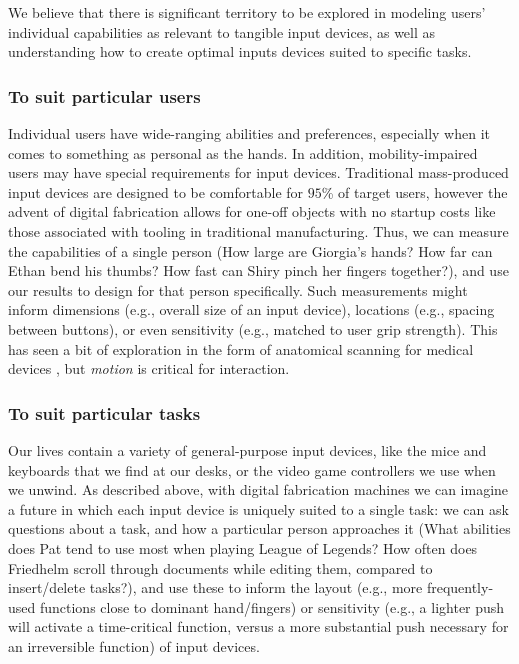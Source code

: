 We believe that there is significant territory to be explored in modeling users' individual capabilities as relevant to tangible input devices, as well as understanding how to create optimal inputs devices suited to specific tasks.

    \subsubsection{To suit particular users}

    Individual users have wide-ranging abilities and preferences, especially when it comes to something as personal as the hands. In addition, mobility-impaired users may have special requirements for input devices. Traditional mass-produced input devices are designed to be comfortable for $95$\% of target users, however the advent of digital fabrication allows for one-off objects with no startup costs like those associated with tooling in traditional manufacturing. Thus, we can measure the capabilities of a single person (How large are Giorgia's hands? How far can Ethan bend his thumbs? How fast can Shiry pinch her fingers together?), and use our results to design for that person specifically. Such measurements might inform dimensions (e.g., overall size of an input device), locations (e.g., spacing between buttons), or even sensitivity (e.g., matched to user grip strength). This has seen a bit of exploration in the form of anatomical scanning for medical devices \cite{smakman-curatio}, but \emph{motion} is critical for interaction.

    \subsubsection{To suit particular tasks}

    Our lives contain a variety of general-purpose input devices, like the mice and keyboards that we find at our desks, or the video game controllers we use when we unwind. As described above, with digital fabrication machines we can imagine a future in which each input device is uniquely suited to a single task: we can ask questions about a task, and how a particular person approaches it (What abilities does Pat tend to use most when playing League of Legends? How often does Friedhelm scroll through documents while editing them, compared to insert/delete tasks?), and use these to inform the layout (e.g., more frequently-used functions close to dominant hand/fingers) or sensitivity (e.g., a lighter push will activate a time-critical function, versus a more substantial push necessary for an irreversible function) of input devices.

